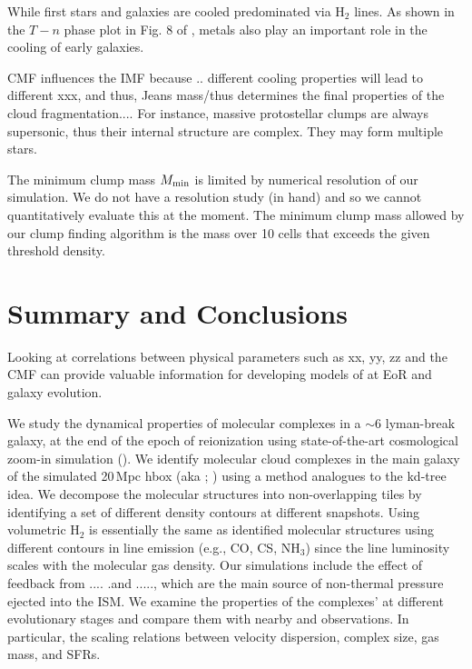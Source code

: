 \documentclass[iop]{emulateapj} %
\begin{document}
While first stars and galaxies are cooled predominated via H$_2$ lines.
As shown in the $T-n$ phase plot in Fig. 8 of \citealt{Pallottini17b}, metals also play an important role in the cooling of early galaxies.


CMF influences the IMF because .. different cooling properties will lead to different xxx, and thus, Jeans mass/thus determines the final properties of the cloud fragmentation....  For instance, massive protostellar clumps are always supersonic, thus their internal structure are complex. They may form multiple stars.


The minimum clump mass $M_{\rm min}$ is limited by numerical resolution of our simulation. We do not have a resolution study (in hand) and so we cannot quantitatively evaluate this at the moment. The minimum clump mass allowed
by our clump finding algorithm is the mass over 10 cells that exceeds the given threshold density.



\section{Summary and Conclusions}      \label{sec:conclusion}
Looking at correlations between physical parameters such as xx, yy, zz and the CMF
can provide valuable information for developing models of \SF at EoR and
galaxy evolution.

We study the dynamical properties of molecular complexes in a \z$\sim$6 lyman-break galaxy,
at the end of the epoch of reionization using state-of-the-art cosmological zoom-in simulation
(). We identify molecular cloud complexes in the main galaxy of the
simulated 20\,Mpc h\pmOne box (aka \flower; \citealt{Pallottini17a}) using a method analogues
to the kd-tree idea. We decompose the molecular structures into non-overlapping tiles
by identifying a set of different density contours at different snapshots.
Using volumetric H$_2$ is essentially the same as identified molecular structures using
different contours in line emission (e.g., CO, CS, NH$_3$)
since the line luminosity scales with the molecular gas density.
Our simulations include the effect of feedback from .... .and ....., which are the main source
of non-thermal pressure ejected into the ISM.
We examine the properties of the complexes' at different evolutionary stages and compare
them with nearby and \highz observations. In particular,
the scaling relations between velocity dispersion, complex size, gas mass,
and SFRs.
\end{document}
